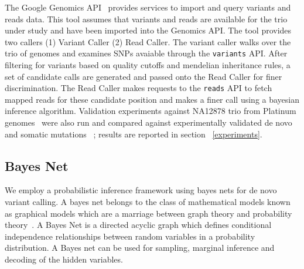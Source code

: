 \documentclass{article}
\begin{document}
The Google Genomics API~\cite{GoogleGenomics} provides services to import and query variants and reads data. This tool assumes that variants and reads are available for the trio under study and have been imported into the Genomics API. The tool provides two callers (1) Variant Caller (2) Read Caller. The variant caller walks over the trio of genomes and examines SNPs avaiable through the \verb|variants| API. After filtering for variants based on quality cutoffs and mendelian inheritance rules, a set of candidate calls are generated and passed onto the Read Caller for finer discrimination. The Read Caller makes requests to the \verb|reads| API to fetch mapped reads for these candidate position and makes a finer call using a bayesian inference algorithm.  Validation experiments against NA12878 trio from Platinum genomes~\cite{platinum} were also run and compared against experimentally validated de novo and somatic mutations~\cite{Conrad2011} ; results are reported in section ~\ref{experiments}.

\subsection{Bayes Net}
We employ a probabilistic inference framework using bayes nets for de novo variant calling. A bayes net belongs to the class of mathematical models known as graphical models which are a marriage between graph theory and probability theory~\cite{Jordan2008}. A Bayes Net is a directed acyclic graph which defines conditional independence relationships between random variables in a probability distribution. A Bayes net can be used for sampling, marginal inference and decoding of the hidden variables. 
\end{document}

